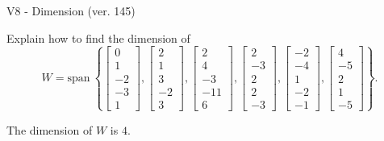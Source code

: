 \begin{exercise}
  \begin{exerciseTitle}V8 - Dimension (ver. 145)\end{exerciseTitle}
  \begin{exerciseStatement}
    Explain how to find the dimension of 
\[W=\mathrm{span}\ \left\{\left[\begin{array}{r}
0 \\
1 \\
-2 \\
-3 \\
1
\end{array}\right] , \left[\begin{array}{r}
2 \\
1 \\
3 \\
-2 \\
3
\end{array}\right] , \left[\begin{array}{r}
2 \\
4 \\
-3 \\
-11 \\
6
\end{array}\right] , \left[\begin{array}{r}
2 \\
-3 \\
2 \\
2 \\
-3
\end{array}\right] , \left[\begin{array}{r}
-2 \\
-4 \\
1 \\
-2 \\
-1
\end{array}\right] , \left[\begin{array}{r}
4 \\
-5 \\
2 \\
1 \\
-5
\end{array}\right]\right\}.\]



  \end{exerciseStatement}
  \begin{exerciseAnswer}
   The dimension of \(W\) is  \(4\).
  


  \end{exerciseAnswer}
\end{exercise}